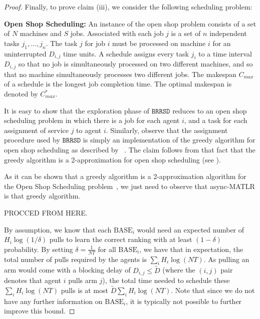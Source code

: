 \documentclass[letterpaper,11pt]{article}
\newcommand{\baserank}{$\mathrm{BASE}$}
\begin{document}
\begin{proof}
Finally, to prove claim (iii), we consider the following scheduling problem:

\textbf{Open Shop Scheduling:} An instance of the open shop problem consists of a set of $N$ machines and $S$ jobs. Associated with each job $j$ is a set of $n$ independent tasks $j_{1}, \dots, j_{n}$. The task $j$ for job $i$ must be processed on machine $i$ for an uninterrupted $D_{i, j}$ time units. A schedule assigns every task $j_{i}$ to a time interval $D_{i, j}$ so that no job is simultaneously processed on two different machines, and so that no machine simultaneously processes two different jobs. The makespan $C_{max}$ of a schedule is the longest job completion time. The optimal makespan is denoted by $C^{*}_{max}$.

It is easy to show that the exploration phase of $\texttt{BRRSD}$ reduces to an open shop scheduling problem in which there is a job for each agent $i$, and a task for each assignment of service $j$ to agent $i$. Similarly, observe that the assignment procedure used by $\texttt{BRRSD}$ is simply an implementation of the greedy algorithm for open shop scheduling as described by ~\cite{woeginger2018open}. The claim follows from that fact that the greedy algorithm is a 2-approximation for open shop scheduling (see \cite{woeginger2018open}).

\iffalse
As it can be shown that a greedy algorithm is a 2-approximation algorithm for the Open Shop Scheduling problem~\cite{woeginger2018open}, we just need to observe that async-MATLR is that greedy algorithm.

PROCCED FROM HERE.



By assumption, we know that each \baserank$_i$ would need an expected number of $H_i \log(1/\delta)$ pulls to learn the correct ranking with at least $(1-\delta)$ probability. By setting $\delta = \frac{1}{NT}$ for all \baserank$_i$, we have that in expectation, the total number of pulls required by the agents is $\sum_{i}H_i\log(NT)$. As pulling an arm would come with a blocking delay of $D_{i,j} \leq \tilde{D}$ (where the $(i,j)$ pair denotes that agent $i$ pulls arm $j$), the total time needed to schedule these $\sum_{i}H_i\log(NT)$ pulls is at most $\tilde{D}\sum_{i}H_i\log(NT)$. Note that since we do not have any further information on \baserank$_i$, it is typically not possible to further improve this bound. %
 

\end{proof}
\end{document}
